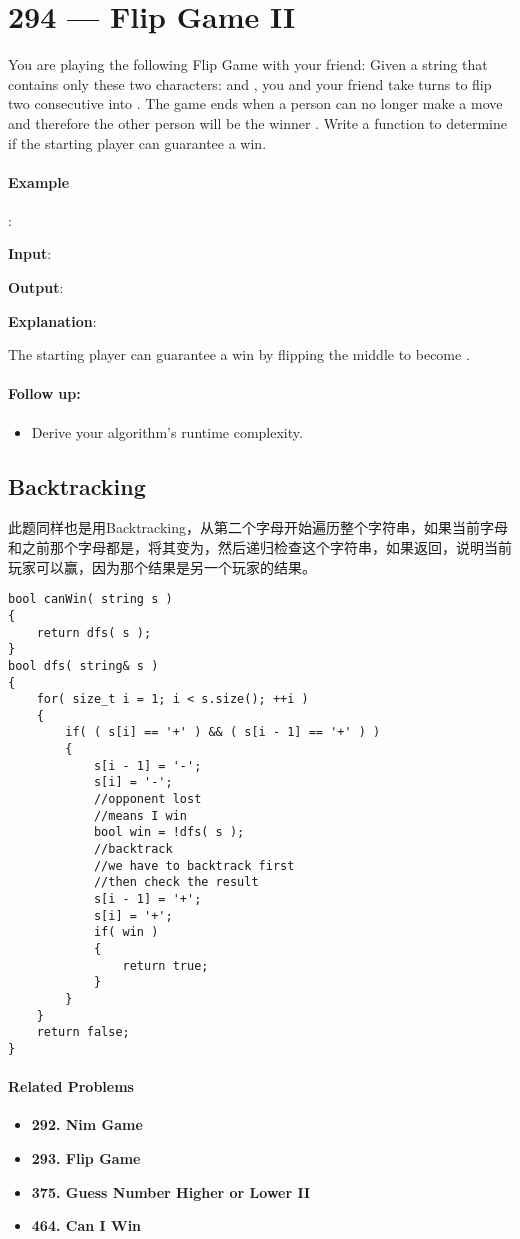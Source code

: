 \section{294 --- Flip Game II}
You are playing the following Flip Game with your friend: Given a string that contains only these two characters:  and , you and your friend take turns to flip two consecutive  into . The game ends when a person can no longer make a move and therefore the other person will be the winner
.
Write a function to determine if the starting player can guarantee a win.

\paragraph{Example}:

\begin{flushleft}
\textbf{Input}: 

\textbf{Output}:  

\textbf{Explanation}:

The starting player can guarantee a win by flipping the middle  to become .
\end{flushleft}

\paragraph{Follow up:}
\begin{itemize}
\item Derive your algorithm's runtime complexity.
\end{itemize}
\subsection{Backtracking}
此题同样也是用Backtracking，从第二个字母开始遍历整个字符串，如果当前字母和之前那个字母都是，将其变为，然后递归检查这个字符串，如果返回，说明当前玩家可以赢，因为那个结果是另一个玩家的结果。
\setcounter{lstlisting}{0}
\begin{lstlisting}[style=customc, caption={Backtracking}]
bool canWin( string s )
{
    return dfs( s );
}
bool dfs( string& s )
{
    for( size_t i = 1; i < s.size(); ++i )
    {
        if( ( s[i] == '+' ) && ( s[i - 1] == '+' ) )
        {
            s[i - 1] = '-';
            s[i] = '-';
            //opponent lost
            //means I win
            bool win = !dfs( s );
            //backtrack
            //we have to backtrack first
            //then check the result
            s[i - 1] = '+';
            s[i] = '+';
            if( win )
            {
                return true;
            }
        }
    }
    return false;
}

\end{lstlisting}


\paragraph{Related Problems}
\begin{itemize}
\item \textbf{292. Nim Game}
\item \textbf{293. Flip Game}
\item \textbf{375. Guess Number Higher or Lower II}
\item \textbf{464. Can I Win}
\end{itemize}